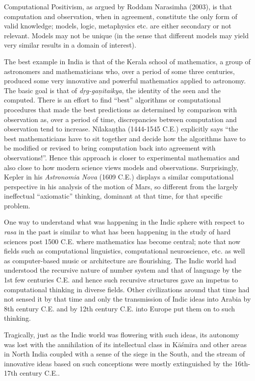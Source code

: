 {Computational Positivism, as argued by Roddam Narasimha (2003), is that computation and observation, when in agreement, constitute the only form of valid knowledge; models, logic, metaphysics etc. are either secondary or not relevant. Models may not be unique (in the sense that different models may yield very similar results in a domain of interest).

The best example in India is that of the Kerala school of mathematics, a group of astronomers and mathematicians who, over a period of some three centuries, produced some very innovative and powerful mathematics applied to astronomy. The basic goal is that of \textsl{dṛg-gaṇitaikya}, the identity of the seen and the computed. There is an effort to find “best” algorithms or computational procedures that made the best predictions as determined by comparison with observation as, over a period of time, discrepancies between computation and observation tend to increase. Nīlakaṇṭha (1444-1545 C.E.) explicitly says “the best mathematicians have to sit together and decide how the algorithms have to be modified or revised to bring computation back into agreement with observations!”. Hence this approach is closer to experimental mathematics and also close to how modern science views models and observations. Surprisingly, Kepler in his \textsl{Astronomia Nova} (1609 C.E.) displays a similar computational perspective in his analysis of the motion of Mars, so different from the largely ineffectual “axiomatic” thinking, dominant at that time, for that specific problem.

One way to understand what was happening in the Indic sphere with respect to \textsl{rasa} in the past is similar to what has been happening in the study of hard sciences post 1500 C.E. where mathematics has become central; note that now fields such as computational linguistics, computational neuroscience, etc. as well as computer-based music or architecture are flourishing. The Indic world had understood the recursive nature of number system and that of language by the 1st few centuries C.E. and hence such recursive structures gave an impetus to computational thinking in diverse fields. Other civilizations around that time had not sensed it by that time and only the transmission of Indic ideas into Arabia by 8th century C.E. and by 12th century C.E. into Europe put them on to such thinking. 

Tragically, just as the Indic world was flowering with such ideas, its autonomy was lost with the annihilation of its intellectual class in Kāśmīra and other areas in North India coupled with a sense of the siege in the South, and the stream of innovative ideas based on such conceptions were mostly extinguished by the 16th-17th century C.E..
}

